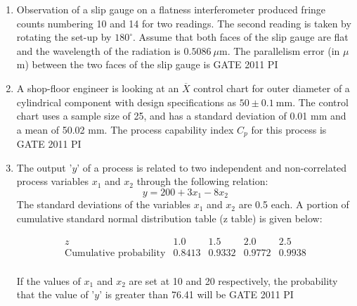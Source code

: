 \documentclass[journal,12pt,onecolumn]{IEEEtran}
\theoremstyle{remark}
\begin{document}
\begin{enumerate}
\item
Observation of a slip gauge on a flatness interferometer produced fringe counts numbering 10 and 14 for two readings. The second reading is taken by rotating the set-up by $180^\circ$. Assume that both faces of the slip gauge are flat and the wavelength of the radiation is $0.5086~\mu$m. The parallelism error (in $\mu$m) between the two faces of the slip gauge is
\hfill{GATE 2011 PI}
\begin{enumerate}
\end{enumerate}

\item
A shop-floor engineer is looking at an $\overline{X}$ control chart for outer diameter of a cylindrical component with design specifications as $50 \pm 0.1~\text{mm}$. The control chart uses a sample size of 25, and has a standard deviation of 0.01 mm and a mean of 50.02 mm. The process capability index $C_p$ for this process is
\hfill{GATE 2011 PI}
\begin{enumerate}
\end{enumerate}
\item
The output '$y$' of a process is related to two independent and non-correlated process variables $x_1$ and $x_2$ through the following relation:
\[
y = 200 + 3x_1 - 8x_2
\]
The standard deviations of the variables $x_1$ and $x_2$ are 0.5 each. A portion of cumulative standard normal distribution table (z table) is given below:

\[
\begin{array}{c|ccccc}
z & 1.0 & 1.5 & 2.0 & 2.5 \\
\hline
\text{Cumulative probability} & 0.8413 & 0.9332 & 0.9772 & 0.9938 \\
\end{array}
\]

If the values of $x_1$ and $x_2$ are set at 10 and 20 respectively, the probability that the value of '$y$' is greater than 76.41 will be
\hfill{GATE 2011 PI}
\begin{enumerate}
\end{enumerate}


\end{enumerate}
\end{document}
